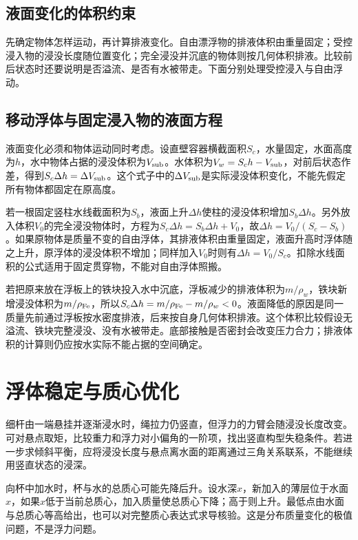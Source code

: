 \subsection{液面变化的体积约束}
先确定物体怎样运动，再计算排液变化。自由漂浮物的排液体积由重量固定；受控浸入物的浸没长度随位置变化；完全浸没并沉底的物体则按几何体积排液。比较前后状态时还要说明是否溢流、是否有水被带走。下面分别处理受控浸入与自由浮动。



\subsection{移动浮体与固定浸入物的液面方程}
液面变化必须和物体运动同时考虑。设直壁容器横截面积$S_c$，水量固定，水面高度为$h$，水中物体占据的浸没体积为$V_{\rm sub}$。水体积为$V_w=S_ch-V_{\rm sub}$，对前后状态作差，得到$S_c\Delta h=\Delta V_{\rm sub}$。这个式子中的$\Delta V_{\rm sub}$是实际浸没体积变化，不能先假定所有物体都固定在原高度。

若一根固定竖柱水线截面积为$S_b$，液面上升$\Delta h$使柱的浸没体积增加$S_b\Delta h$。另外放入体积$V_0$的完全浸没物体时，方程为$S_c\Delta h=S_b\Delta h+V_0$，故$\Delta h=V_0/(S_c-S_b)$。如果原物体是质量不变的自由浮体，其排液体积由重量固定，液面升高时浮体随之上升，原浮体的浸没体积不增加；同样加入$V_0$时则有$\Delta h=V_0/S_c$。扣除水线面积的公式适用于固定贯穿物，不能对自由浮体照搬。

若把原来放在浮板上的铁块投入水中沉底，浮板减少的排液体积为$m/\rho_w$，铁块新增浸没体积为$m/\rho_{\rm Fe}$，所以$S_c\Delta h=m/\rho_{\rm Fe}-m/\rho_w<0$。液面降低的原因是同一质量先前通过浮板按水密度排液，后来按自身几何体积排液。这个体积比较假设无溢流、铁块完整浸没、没有水被带走。底部接触是否密封会改变压力合力；排液体积的计算则仍应按水实际不能占据的空间确定。


\section{浮体稳定与质心优化}
细杆由一端悬挂并逐渐浸水时，绳拉力仍竖直，但浮力的力臂会随浸没长度改变。可对悬点取矩，比较重力和浮力对小偏角的一阶项，找出竖直构型失稳条件。若进一步求倾斜平衡，应将浸没长度与悬点离水面的距离通过三角关系联系，不能继续用竖直状态的浸深。

向杯中加水时，杯与水的总质心可能先降后升。设水深$x$，新加入的薄层位于水面$x$，如果$x$低于当前总质心，加入质量使总质心下降；高于则上升。最低点由水面与总质心等高给出，也可以对完整质心表达式求导核验。这是分布质量变化的极值问题，不是浮力问题。

